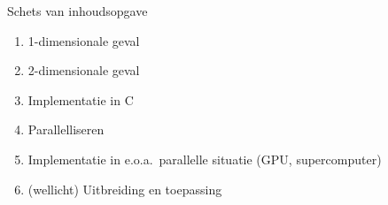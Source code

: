 \documentclass{beamer}
\begin{document}
\begin{frame}{Schets van inhoudsopgave}
  \begin{enumerate}
    \item 1-dimensionale geval \pause
    \item 2-dimensionale geval \pause
    \item Implementatie in C \pause
    \item Parallelliseren \pause
    \item Implementatie in e.o.a.~parallelle situatie (GPU, supercomputer) \pause
    \item (wellicht) Uitbreiding en toepassing
  \end{enumerate}
\end{frame}
\end{document}
